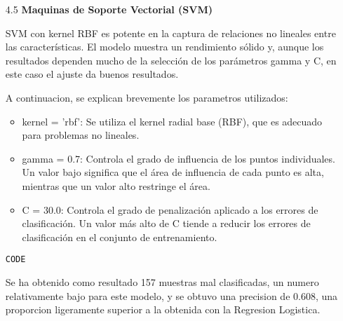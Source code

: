 \documentclass{article}
\begin{document}
\begin{itemize}

\item[4.5]  {\bf Maquinas de Soporte Vectorial (SVM)}

SVM con kernel RBF es potente en la captura de relaciones no lineales entre las características. El modelo muestra un rendimiento sólido y, aunque los resultados dependen mucho de la selección de los parámetros gamma y C, en este caso el ajuste da buenos resultados.

A continuacion, se explican brevemente los parametros utilizados:

\begin{itemize}

\item
kernel = 'rbf': Se utiliza el kernel radial base (RBF), que es adecuado para problemas no lineales.

\item
gamma = 0.7: Controla el grado de influencia de los puntos individuales. Un valor bajo significa que el área de influencia de cada punto es alta, mientras que un valor alto restringe el área.

\item
C = 30.0: Controla el grado de penalización aplicado a los errores de clasificación. Un valor más alto de C tiende a reducir los errores de clasificación en el conjunto de entrenamiento.

\end{itemize}

\begin{tcolorbox}[width=14cm]
\begin{scriptsize}
\begin{verbatim}
CODE
\end{verbatim}
\end{scriptsize}
\end{tcolorbox}

Se ha obtenido como resultado 157 muestras mal clasificadas, un numero relativamente bajo para este modelo, y se obtuvo una precision de 0.608, una proporcion ligeramente superior a la obtenida con la Regresion Logistica.

\end{itemize}

\bigskip
\end{document}

